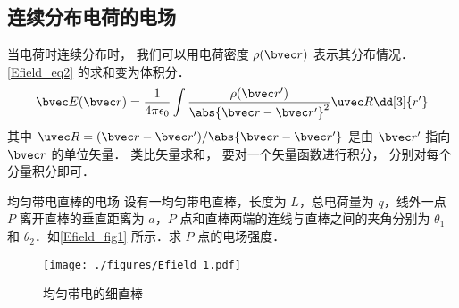 \subsection{连续分布电荷的电场}
当电荷时连续分布时， 我们可以用电荷密度 $\rho(\bvec r)$ 表示其分布情况． \autoref{Efield_eq2} 的求和变为体积分．
\begin{equation}\label{Efield_eq9}
\bvec E(\bvec r) = \frac{1}{4\pi\epsilon_0} \int \frac{\rho(\bvec r')}{\abs{\bvec r - \bvec r'}^2} \uvec R \dd[3]{r'}
\end{equation}
其中 $\uvec R = (\bvec r - \bvec r') / \abs{\bvec r - \bvec r'}$ 是由 $\bvec r'$ 指向 $\bvec r$ 的单位矢量． 类比矢量求和， 要对一个矢量函数进行积分， 分别对每个分量积分即可．

\begin{example}{均匀带电直棒的电场}\label{Efield_ex1}
设有一均匀带电直棒，长度为 $L$，总电荷量为 $q$，线外一点 $P$ 离开直棒的垂直距离为 $a$，$P$ 点和直棒两端的连线与直棒之间的夹角分别为 $\theta_1$ 和 $\theta_2$．如\autoref{Efield_fig1} 所示．求 $P$ 点的电场强度．
\begin{figure}[ht]
\centering
\texttt{[image: ./figures/Efield\_1.pdf]}
\caption{均匀带电的细直棒} \label{Efield_fig1}
\end{figure}


\end{example}
